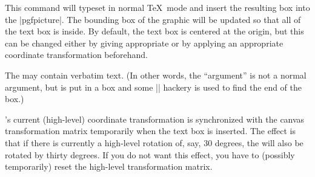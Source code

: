 \begin{command}{\pgftext{}}
    This command will typeset  in normal \TeX\ mode and insert the
    resulting box into the |{pgfpicture}|. The bounding box of the graphic will
    be updated so that all of the text box is inside. By default, the text box
    is centered at the origin, but this can be changed either by giving
    appropriate  or by applying an appropriate coordinate
    transformation beforehand.

    The  may contain verbatim text. (In other words, the 
    ``argument'' is not a normal argument, but is put in a box and some
    |\aftergroup| hackery is used to find the end of the box.)

    \pgfname's current (high-level) coordinate transformation is synchronized
    with the canvas transformation matrix temporarily when the text box is
    inserted. The effect is that if there is currently a high-level rotation
    of, say, 30 degrees, the  will also be rotated by thirty
    degrees. If you do not want this effect, you have to (possibly temporarily)
    reset the high-level transformation matrix.


\end{command}
